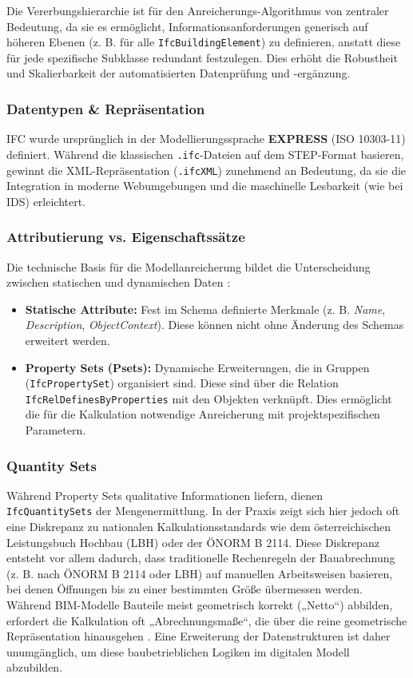 Die Vererbungshierarchie ist für den Anreicherungs-Algorithmus von zentraler Bedeutung, da sie es ermöglicht, Informationsanforderungen generisch auf höheren Ebenen (z. B. für alle \texttt{IfcBuildingElement}) zu definieren, anstatt diese für jede spezifische Subklasse redundant festzulegen. Dies erhöht die Robustheit und Skalierbarkeit der automatisierten Datenprüfung und -ergänzung.

\subsubsection{Datentypen \& Repräsentation}
IFC wurde ursprünglich in der Modellierungssprache \textbf{EXPRESS} (ISO 10303-11) definiert. Während die klassischen \texttt{.ifc}-Dateien auf dem STEP-Format basieren, gewinnt die XML-Repräsentation (\texttt{.ifcXML}) zunehmend an Bedeutung, da sie die Integration in moderne Webumgebungen und die maschinelle Lesbarkeit (wie bei IDS) erleichtert.

\subsubsection{Attributierung vs. Eigenschaftssätze}
Die technische Basis für die Modellanreicherung bildet die Unterscheidung zwischen statischen und dynamischen Daten \cite{eichler2024bimcert}:
\begin{itemize}
    \item \textbf{Statische Attribute:} Fest im Schema definierte Merkmale (z. B. \textit{Name}, \textit{Description}, \textit{ObjectContext}). Diese können nicht ohne Änderung des Schemas erweitert werden.
    \item \textbf{Property Sets (Psets):} Dynamische Erweiterungen, die in Gruppen (\texttt{IfcPropertySet}) organisiert sind. Diese sind über die Relation \texttt{IfcRelDefinesByProperties} mit den Objekten verknüpft. Dies ermöglicht die für die Kalkulation notwendige Anreicherung mit projektspezifischen Parametern.
\end{itemize}

\subsubsection{Quantity Sets}
Während Property Sets qualitative Informationen liefern, dienen \texttt{IfcQuantitySets} der Mengenermittlung. In der Praxis zeigt sich hier jedoch oft eine Diskrepanz zu nationalen Kalkulationsstandards wie dem österreichischen Leistungsbuch Hochbau (LBH) oder der ÖNORM B 2114. Diese Diskrepanz entsteht vor allem dadurch, dass traditionelle Rechenregeln der Bauabrechnung (z. B. nach ÖNORM B 2114 oder LBH) auf manuellen Arbeitsweisen basieren, bei denen Öffnungen bis zu einer bestimmten Größe übermessen werden. Während BIM-Modelle Bauteile meist geometrisch korrekt („Netto“) abbilden, erfordert die Kalkulation oft „Abrechnungsmaße“, die über die reine geometrische Repräsentation hinausgehen \cite{borrmann2015building}. Eine Erweiterung der Datenstrukturen ist daher unumgänglich, um diese baubetrieblichen Logiken im digitalen Modell abzubilden.

